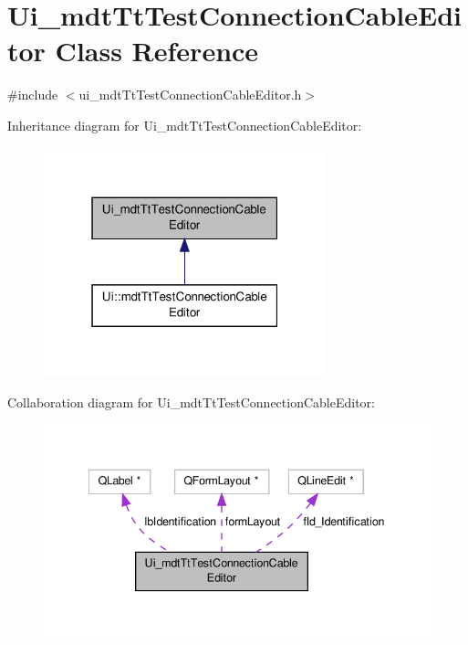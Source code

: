 \hypertarget{class_ui__mdt_tt_test_connection_cable_editor}{\section{Ui\-\_\-mdt\-Tt\-Test\-Connection\-Cable\-Editor Class Reference}
\label{class_ui__mdt_tt_test_connection_cable_editor}
}


{\ttfamily \#include $<$ui\-\_\-mdt\-Tt\-Test\-Connection\-Cable\-Editor.\-h$>$}



Inheritance diagram for Ui\-\_\-mdt\-Tt\-Test\-Connection\-Cable\-Editor\-:
\nopagebreak
\begin{figure}[H]
\begin{center}
\leavevmode
\includegraphics[width=232pt]{class_ui__mdt_tt_test_connection_cable_editor__inherit__graph}
\end{center}
\end{figure}


Collaboration diagram for Ui\-\_\-mdt\-Tt\-Test\-Connection\-Cable\-Editor\-:
\nopagebreak
\begin{figure}[H]
\begin{center}
\leavevmode
\includegraphics[width=341pt]{class_ui__mdt_tt_test_connection_cable_editor__coll__graph}
\end{center}
\end{figure}
